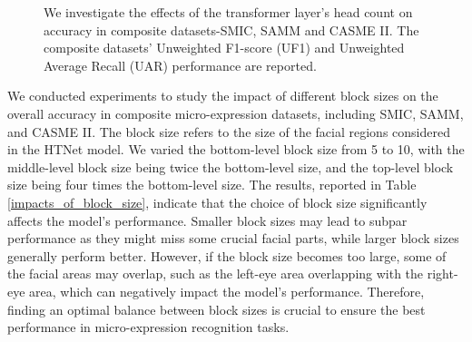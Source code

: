 \documentclass[review,12pt, 3p]{elsarticle}
\begin{document}
\begin{figure}[!t]
\centering
{}
\caption{We investigate the effects of the transformer layer's head count on accuracy in composite datasets-SMIC, SAMM and CASME II. The composite datasets' Unweighted F1-score (UF1) and Unweighted Average Recall (UAR) performance are reported.}
\label{heads_number}
\end{figure}
We conducted experiments to study the impact of different block sizes on the overall accuracy in composite micro-expression datasets, including SMIC, SAMM, and CASME II. The block size refers to the size of the facial regions considered in the HTNet model. We varied the bottom-level block size from 5 to 10, with the middle-level block size being twice the bottom-level size, and the top-level block size being four times the bottom-level size. The results, reported in Table \ref{impacts_of_block_size}, indicate that the choice of block size significantly affects the model's performance. Smaller block sizes may lead to subpar performance as they might miss some crucial facial parts, while larger block sizes generally perform better. However, if the block size becomes too large, some of the facial areas may overlap, such as the left-eye area overlapping with the right-eye area, which can negatively impact the model's performance. Therefore, finding an optimal balance between block sizes is crucial to ensure the best performance in micro-expression recognition tasks.
\end{document}
